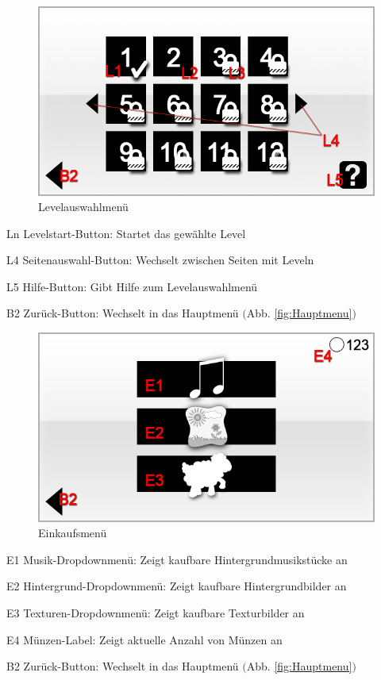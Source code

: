 \begin{figure}[H]
\centering
\includegraphics[scale=0.55]{../gui/_jpeg_numeration/level.jpg}
\caption{Levelauswahlmenü}
\label{fig:Levelauswahlmenu}
\end{figure}
\begin{description*}
\item[Ln] Levelstart-Button: Startet das gewählte Level
\item[L4] Seitenauswahl-Button: Wechselt zwischen Seiten mit Leveln
\item[L5] Hilfe-Button: Gibt Hilfe zum Levelauswahlmenü
\item[B2] Zurück-Button: Wechselt in das Hauptmenü $($Abb. \ref{fig:Hauptmenu}$)$
\end{description*}


\begin{figure}[H]
\centering
\includegraphics[scale=0.55]{../gui/_jpeg_numeration/shop.jpg}
\caption{Einkaufsmenü}
\label{fig:Einkaufsmenu}
\end{figure}
\begin{description*}
\item[E1] Musik-Dropdownmenü: Zeigt kaufbare Hintergrundmusikstücke an
\item[E2] Hintergrund-Dropdownmenü: Zeigt kaufbare Hintergrundbilder an
\item[E3] Texturen-Dropdownmenü: Zeigt kaufbare Texturbilder an
\item[E4] Münzen-Label: Zeigt aktuelle Anzahl von Münzen an
\item[B2] Zurück-Button: Wechselt in das Hauptmenü $($Abb. \ref{fig:Hauptmenu}$)$
\end{description*}


